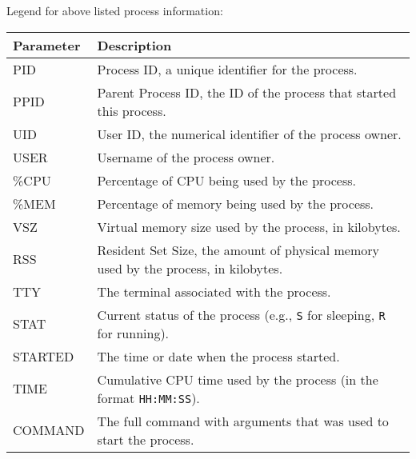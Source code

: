 \documentclass{article}
\begin{document}
\begin{enumerate}[label=\textbf{\alph*})]
    Legend for above listed process information:
    {\ttfamily\scriptsize
    \begin{longtable}{|l|p{12cm}|}
        \hline
        \textbf{Parameter} & \textbf{Description} \\ \hline
        PID & Process ID, a unique identifier for the process. \\ \hline
        PPID & Parent Process ID, the ID of the process that started this process. \\ \hline
        UID & User ID, the numerical identifier of the process owner. \\ \hline
        USER & Username of the process owner. \\ \hline
        \%CPU & Percentage of CPU being used by the process. \\ \hline
        \%MEM & Percentage of memory being used by the process. \\ \hline
        VSZ & Virtual memory size used by the process, in kilobytes. \\ \hline
        RSS & Resident Set Size, the amount of physical memory used by the process, in kilobytes. \\ \hline
        TTY & The terminal associated with the process. \\ \hline
        STAT & Current status of the process (e.g., \texttt{S} for sleeping, \texttt{R} for running). \\ \hline
        STARTED & The time or date when the process started. \\ \hline
        TIME & Cumulative CPU time used by the process (in the format \texttt{HH:MM:SS}). \\ \hline
        COMMAND & The full command with arguments that was used to start the process. \\ \hline
        \end{longtable}
    }


\end{enumerate}
\end{document}
